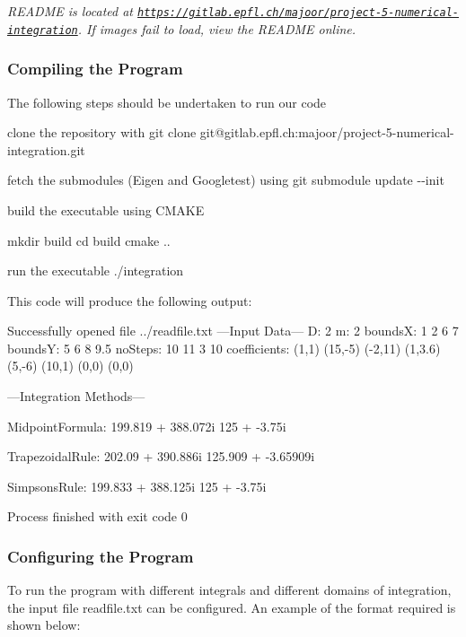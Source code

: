 {\itshape R\+E\+A\+D\+ME is located at \href{https://gitlab.epfl.ch/majoor/project-5-numerical-integration}{\tt https\+://gitlab.\+epfl.\+ch/majoor/project-\/5-\/numerical-\/integration}. If images fail to load, view the R\+E\+A\+D\+ME online.}

\subsubsection*{Compiling the Program}

The following steps should be undertaken to run our code
\begin{DoxyItemize}
\item clone the repository with {\ttfamily git clone git@gitlab.\+epfl.\+ch\+:majoor/project-\/5-\/numerical-\/integration.\+git}
\item fetch the submodules (Eigen and Googletest) using {\ttfamily git submodule update -\/-\/init}
\item build the executable using C\+M\+A\+KE 
\begin{DoxyCode}
mkdir build
cd build
cmake ..
\end{DoxyCode}

\item run the executable {\ttfamily ./integration}
\end{DoxyItemize}

This code will produce the following output\+: 
\begin{DoxyCode}
Successfully opened file ../readfile.txt
---Input Data---
D: 2
m: 2
boundsX: 
1 2
6 7
boundsY: 
  5   6
  8 9.5
noSteps: 
10 11
 3 10
coefficients: 
  (1,1) (15,-5) (-2,11) (1,3.6)
 (5,-6)  (10,1)   (0,0)   (0,0)

---Integration Methods---

MidpointFormula:
199.819 + 388.072i
125 + -3.75i

TrapezoidalRule:
202.09 + 390.886i
125.909 + -3.65909i

SimpsonsRule:
199.833 + 388.125i
125 + -3.75i

Process finished with exit code 0
\end{DoxyCode}


\subsubsection*{Configuring the Program}

To run the program with different integrals and different domains of integration, the input file {\ttfamily readfile.\+txt} can be configured. An example of the format required is shown below\+:



